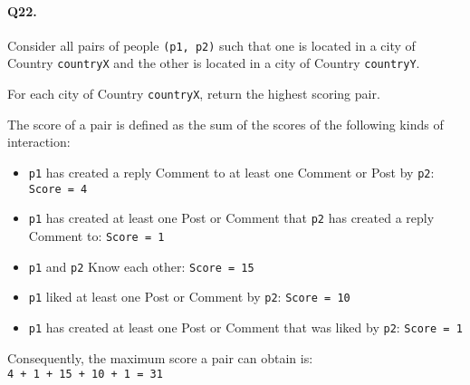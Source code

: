\paragraph{Q22.}

Consider all pairs of people \texttt{(p1,\ p2)} such that one is located
in a city of Country \texttt{countryX} and the other is located in a
city of Country \texttt{countryY}.

For each city of Country \texttt{countryX}, return the highest scoring
pair.

The score of a pair is defined as the sum of the scores of the following
kinds of interaction:

\begin{itemize}
\tightlist
\item
  \texttt{p1} has created a reply Comment to at least one Comment or
  Post by \texttt{p2}: \texttt{Score\ =\ 4}
\item
  \texttt{p1} has created at least one Post or Comment that \texttt{p2}
  has created a reply Comment to: \texttt{Score\ =\ 1}
\item
  \texttt{p1} and \texttt{p2} Know each other: \texttt{Score\ =\ 15}
\item
  \texttt{p1} liked at least one Post or Comment by \texttt{p2}:
  \texttt{Score\ =\ 10}
\item
  \texttt{p1} has created at least one Post or Comment that was liked by
  \texttt{p2}: \texttt{Score\ =\ 1}
\end{itemize}

Consequently, the maximum score a pair can obtain is:
\texttt{4\ +\ 1\ +\ 15\ +\ 10\ +\ 1\ =\ 31}
